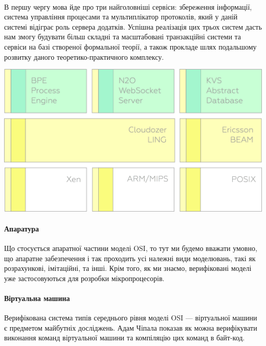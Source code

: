 \documentclass[11pt,oneside]{article}
\begin{document}
   \paragraph{}
   В першу чергу мова йде про три найголовніші
   сервіси: збереження інформації, система управління процесами та мультиплікатор протоколів,
   який у даній системі відіграє роль сервера додатків. Успішна реалізація цих трьох систем
   дасть нам змогу будувати більш складні та масштабовані транзакційні системи та сервіси на базі
   створеної формальної теорії, а також прокладе шлях подальшому розвитку даного
   теоретико-практичного комплексу.

   \begin{center}
   \vspace{0.5cm}
   \includegraphics[scale=0.15]{img/exe-res}
   \end{center}

   \paragraph{\bf Апаратура}
   Що стосується апаратної частини моделі OSI, то тут ми будемо вважати умовно,
   що апаратне забезпечення і так проходить усі належні види моделювань, такі як
   розрахункові, імітаційні, та інші. Крім того, як ми знаємо, верифіковані моделі уже застосовуються
   для розробки мікропроцесорів.

   \paragraph{\bf Віртуальна машина}
   Верифікована система типів середнього рівня моделі OSI --- віртуальної машини
   є предметом майбутніх досліджень. Адам Чіпала \cite{chipvm} показав як можна
   верифікувати виконання команд віртуальної машини та компіляцію цих команд в байт-код.
\end{document}
